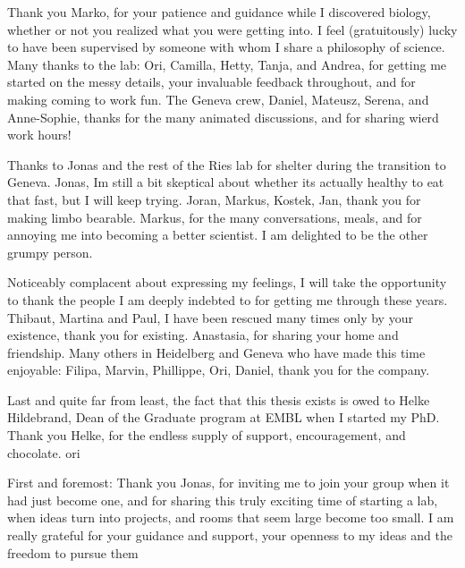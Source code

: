 \documentclass[
12pt, %
ngerman,
english, %
onehalfspacing,
hidelinks,
headsepline, %
]{MastersDoctoralThesis} %
\begin{document}
\begin{acknowledgements}

Thank you Marko, for your patience and guidance while I discovered biology, whether or not you realized what you were getting into. I feel (gratuitously) lucky to have been supervised by someone with whom I share a philosophy of science. Many thanks to the lab: Ori, Camilla, Hetty, Tanja, and Andrea, for getting me started on the messy details, your invaluable feedback throughout, and for making coming to work fun. The Geneva crew, Daniel, Mateusz, Serena, and Anne-Sophie, thanks for the many animated discussions, and for sharing wierd work hours! 

Thanks to Jonas and the rest of the Ries lab for shelter during the transition to Geneva. Jonas, Im still a bit skeptical about whether its actually healthy to eat that fast, but I will keep trying. Joran, Markus, Kostek, Jan, thank you for making limbo bearable. Markus, for the many conversations, meals, and for annoying me into becoming a better scientist. I am delighted to be the other grumpy person. 

Noticeably complacent about expressing my feelings, I will take the opportunity to thank the people I am deeply indebted to for getting me through these years. Thibaut, Martina and Paul, I have been rescued many times only by your existence, thank you for existing. Anastasia, for sharing your home and friendship. Many others in Heidelberg and Geneva who have made this time enjoyable: Filipa, Marvin, Phillippe, Ori, Daniel, thank you for the company.

Last and quite far from least, the fact that this thesis exists is owed to Helke Hildebrand, Dean of the Graduate program at EMBL when I started my PhD. Thank you Helke, for the endless supply of support, encouragement, and chocolate. 
ori


First and foremost: Thank you Jonas, for inviting me to join your group when it had just become one, and for sharing this truly exciting time of starting a lab, when ideas turn into projects, and rooms that seem large become too small. I am really grateful for your guidance and support, your openness to my ideas and the freedom to pursue them

\vspace{\baselineskip}




\end{acknowledgements}
\end{document}
